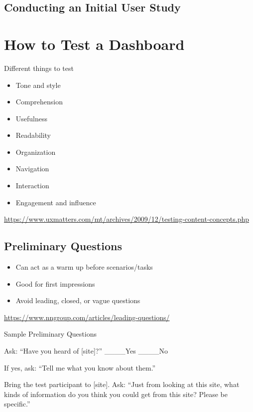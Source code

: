 \documentclass[
]{krantz}
\providecommand{\tightlist}{%
  \setlength{\itemsep}{0pt}\setlength{\parskip}{0pt}}
\begin{document}
\hypertarget{conducting-an-initial-user-study}{%
\subsection{Conducting an Initial User Study}\label{conducting-an-initial-user-study}}

\hypertarget{how-to-test-a-dashboard}{%
\section{How to Test a Dashboard}\label{how-to-test-a-dashboard}}

Different things to test

\begin{itemize}
\tightlist
\item
  Tone and style
\item
  Comprehension
\item
  Usefulness
\item
  Readability
\item
  Organization
\item
  Navigation
\item
  Interaction
\item
  Engagement and influence
\end{itemize}

\url{https://www.uxmatters.com/mt/archives/2009/12/testing-content-concepts.php}

\hypertarget{preliminary-questions}{%
\subsection{Preliminary Questions}\label{preliminary-questions}}

\begin{itemize}
\tightlist
\item
  Can act as a warm up before scenarios/tasks
\item
  Good for first impressions
\item
  Avoid leading, closed, or vague questions
\end{itemize}

\url{https://www.nngroup.com/articles/leading-questions/}

Sample Preliminary Questions

Ask: ``Have you heard of {[}site{]}?''
\_\_\_\_Yes \_\_\_\_No

If yes, ask:
``Tell me what you know about them.''

Bring the test participant to {[}site{]}.
Ask:
``Just from looking at this site, what kinds of information do you think you could get from this site? Please be specific.''
\end{document}
